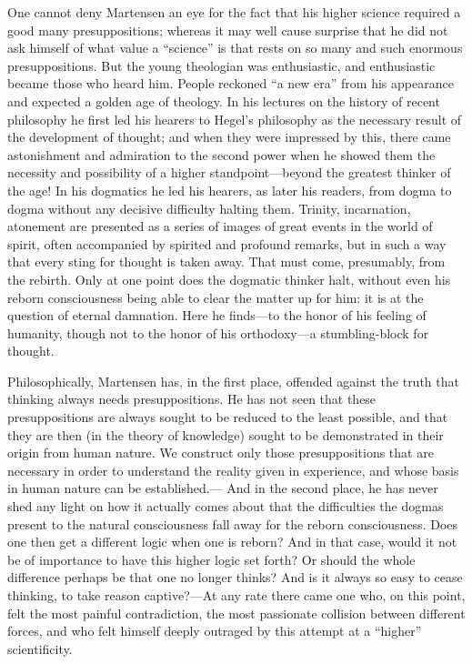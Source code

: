 \documentclass[12pt,a4paper]{book}
\newcommand{\opage}[1]{\marginnote{\footnotesize\textit{[#1]}}}
\begin{document}
One cannot deny Martensen an eye for the fact that his higher science
required a good many presuppositions; whereas it may well cause surprise
that he did not ask himself of what value a ``science'' is that rests on
so many and such enormous presuppositions. But the young theologian was
enthusiastic, and enthusiastic became those who heard him. People reckoned
``a new era'' from his appearance and expected a golden age of theology. In
his lectures on the history of recent philosophy he first led his hearers
to Hegel's philosophy as the necessary result of the development of
thought; and when they were impressed by this, there came astonishment and
admiration to the second power when he showed them the necessity and
possibility of a higher standpoint---beyond the greatest thinker of the
age! In his dogmatics he led his hearers, as later his readers, from
dogma to dogma without any decisive difficulty halting them. Trinity,
incarnation, atonement are presented as a series of images of great events
in the world of spirit, often accompanied by spirited and profound
remarks, but in such a way that every sting for thought is taken away.
That
\opage{20}must come, presumably, from the rebirth. Only at one point does the
dogmatic thinker halt, without even his reborn consciousness being able to
clear the matter up for him: it is at the question of eternal damnation.
Here he finds---to the honor of his feeling of humanity, though not to the
honor of his orthodoxy---a stumbling-block for thought.

Philosophically, Martensen has, in the first place, offended against the
truth that thinking always needs presuppositions. He has not seen that
these presuppositions are always sought to be reduced to the least
possible, and that they are then (in the theory of knowledge) sought to be
demonstrated in their origin from human nature. We construct only those
presuppositions that are necessary in order to understand the reality
given in experience, and whose basis in human nature can be established.---
And in the second place, he has never shed any light on how it actually
comes about that the difficulties the dogmas present to the natural
consciousness fall away for the reborn consciousness. Does one then get a
different logic when one is reborn? And in that case, would it not be of
importance to have this higher logic set forth? Or should the whole
difference perhaps be that one no longer thinks? And is it always so easy
to cease thinking, to take reason captive?---At any rate there came one
who, on this point, felt the most painful contradiction, the most
passionate collision between different forces, and who felt himself
deeply outraged by this attempt at a ``higher'' scientificity.
\end{document}
